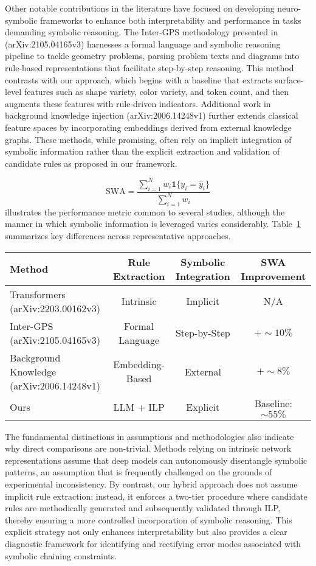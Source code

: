 \documentclass{article}
\begin{document}
Other notable contributions in the literature have focused on developing neuro-symbolic frameworks to enhance both interpretability and performance in tasks demanding symbolic reasoning. The Inter-GPS methodology presented in (arXiv:2105.04165v3) harnesses a formal language and symbolic reasoning pipeline to tackle geometry problems, parsing problem texts and diagrams into rule-based representations that facilitate step-by-step reasoning. This method contrasts with our approach, which begins with a baseline that extracts surface-level features such as shape variety, color variety, and token count, and then augments these features with rule-driven indicators. Additional work in background knowledge injection (arXiv:2006.14248v1) further extends classical feature spaces by incorporating embeddings derived from external knowledge graphs. These methods, while promising, often rely on implicit integration of symbolic information rather than the explicit extraction and validation of candidate rules as proposed in our framework.

\[
\text{SWA} = \frac{\sum_{i=1}^N w_i \mathbf{1}\{y_i=\hat{y}_i\}}{\sum_{i=1}^N w_i}
\]
illustrates the performance metric common to several studies, although the manner in which symbolic information is leveraged varies considerably. Table~\ref{tab:related} summarizes key differences across representative approaches.

\begin{table}[h]
\centering
\begin{tabular}{lccc}
\hline
\textbf{Method} & \textbf{Rule Extraction} & \textbf{Symbolic Integration} & \textbf{SWA Improvement} \\ \hline
Transformers (arXiv:2203.00162v3) & Intrinsic & Implicit & N/A \\[1mm]
Inter-GPS (arXiv:2105.04165v3) & Formal Language & Step-by-Step & \(+\sim10\%\) \\[1mm]
Background Knowledge (arXiv:2006.14248v1) & Embedding-Based & External & \(+\sim8\%\) \\[1mm]
Ours & LLM + ILP & Explicit & Baseline: \(\sim55\%\) \\ \hline
\end{tabular}
\label{tab:related}
\end{table}

The fundamental distinctions in assumptions and methodologies also indicate why direct comparisons are non-trivial. Methods relying on intrinsic network representations assume that deep models can autonomously disentangle symbolic patterns, an assumption that is frequently challenged on the grounds of experimental inconsistency. By contrast, our hybrid approach does not assume implicit rule extraction; instead, it enforces a two-tier procedure where candidate rules are methodically generated and subsequently validated through ILP, thereby ensuring a more controlled incorporation of symbolic reasoning. This explicit strategy not only enhances interpretability but also provides a clear diagnostic framework for identifying and rectifying error modes associated with symbolic chaining constraints.
\end{document}

